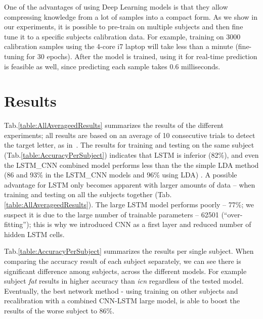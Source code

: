 \documentclass[
12pt, %
english, %
doublespacing, %
headsepline, %
]{MastersDoctoralThesis} %
\begin{document}
One of the advantages of using Deep Learning models is that they allow compressing knowledge from a lot of samples into a compact form. As we show in our experiments, it is possible to pre-train on multiple subjects and then fine tune it to a specific subjects calibration data. For example, training on 3000 calibration samples using the 4-core i7 laptop will take less than a minute (fine-tuning for 30 epochs). After the model is trained, using it for real-time prediction is feasible as well, since predicting each sample takes 0.6 milliseconds.

\chapter{Results}

Tab.\ref{table:AllAverageedResults} summarizes the results of the different experiments; all results are based on an average of 10 consecutive trials to detect the target letter, as in~\cite{BlaknertzExperiment}. The results for training and testing on the same subject (Tab.\ref{table:AccuracyPerSubject}) indicates that LSTM is inferior (82\%), and even the LSTM\_CNN combined model performs less than the the simple LDA method (86 and 93\% in the LSTM\_CNN models and 96\% using LDA) . A possible advantage for LSTM only becomes apparent with larger amounts of data -- when training and testing on all the subjects together (Tab.\ref{table:AllAverageedResults}). The large LSTM model performs poorly -- 77\%; we suspect it is due to the large number of trainable parameters -- 62501 (``over-fitting''); this is why we introduced CNN as a first layer and reduced number of hidden LSTM cells.

Tab.\ref{table:AccuracyPerSubject} summarizes the results per single subject. When comparing the accuracy result of each subject separately, we can see there is significant difference among subjects, across the different models. For example subject \textit{fat} results in higher accuracy than \textit{icn} regardless of the tested model. Eventually, the best network method - using training on other subjects and recalibration with a combined CNN-LSTM large model, is able to boost the results of the worse subject to 86\%.
\end{document}
